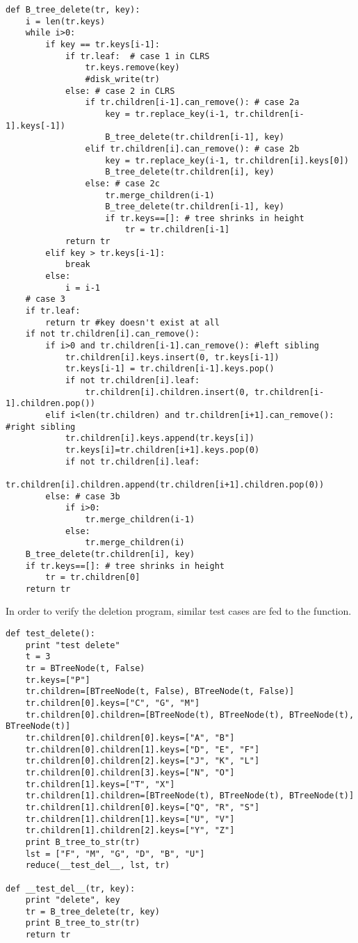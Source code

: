 \documentclass{article}
\begin{document}
\begin{lstlisting}
def B_tree_delete(tr, key):
    i = len(tr.keys)
    while i>0:
        if key == tr.keys[i-1]:
            if tr.leaf:  # case 1 in CLRS
                tr.keys.remove(key)
                #disk_write(tr)
            else: # case 2 in CLRS
                if tr.children[i-1].can_remove(): # case 2a
                    key = tr.replace_key(i-1, tr.children[i-1].keys[-1])
                    B_tree_delete(tr.children[i-1], key)
                elif tr.children[i].can_remove(): # case 2b
                    key = tr.replace_key(i-1, tr.children[i].keys[0])
                    B_tree_delete(tr.children[i], key)
                else: # case 2c
                    tr.merge_children(i-1)
                    B_tree_delete(tr.children[i-1], key)
                    if tr.keys==[]: # tree shrinks in height
                        tr = tr.children[i-1]
            return tr
        elif key > tr.keys[i-1]:
            break
        else:
            i = i-1
    # case 3
    if tr.leaf:
        return tr #key doesn't exist at all
    if not tr.children[i].can_remove():
        if i>0 and tr.children[i-1].can_remove(): #left sibling
            tr.children[i].keys.insert(0, tr.keys[i-1])
            tr.keys[i-1] = tr.children[i-1].keys.pop()
            if not tr.children[i].leaf:
                tr.children[i].children.insert(0, tr.children[i-1].children.pop())
        elif i<len(tr.children) and tr.children[i+1].can_remove(): #right sibling
            tr.children[i].keys.append(tr.keys[i])
            tr.keys[i]=tr.children[i+1].keys.pop(0)
            if not tr.children[i].leaf:
                tr.children[i].children.append(tr.children[i+1].children.pop(0))
        else: # case 3b
            if i>0:
                tr.merge_children(i-1)
            else:
                tr.merge_children(i)
    B_tree_delete(tr.children[i], key)
    if tr.keys==[]: # tree shrinks in height
        tr = tr.children[0]
    return tr
\end{lstlisting}

In order to verify the deletion program, similar test cases are
fed to the function.

\begin{lstlisting}
def test_delete():
    print "test delete"
    t = 3
    tr = BTreeNode(t, False)
    tr.keys=["P"]
    tr.children=[BTreeNode(t, False), BTreeNode(t, False)]
    tr.children[0].keys=["C", "G", "M"]
    tr.children[0].children=[BTreeNode(t), BTreeNode(t), BTreeNode(t), BTreeNode(t)]
    tr.children[0].children[0].keys=["A", "B"]
    tr.children[0].children[1].keys=["D", "E", "F"]
    tr.children[0].children[2].keys=["J", "K", "L"]
    tr.children[0].children[3].keys=["N", "O"]
    tr.children[1].keys=["T", "X"]
    tr.children[1].children=[BTreeNode(t), BTreeNode(t), BTreeNode(t)]
    tr.children[1].children[0].keys=["Q", "R", "S"]
    tr.children[1].children[1].keys=["U", "V"]
    tr.children[1].children[2].keys=["Y", "Z"]
    print B_tree_to_str(tr)
    lst = ["F", "M", "G", "D", "B", "U"]
    reduce(__test_del__, lst, tr)

def __test_del__(tr, key):
    print "delete", key
    tr = B_tree_delete(tr, key)
    print B_tree_to_str(tr)
    return tr
\end{lstlisting}
\end{document}
